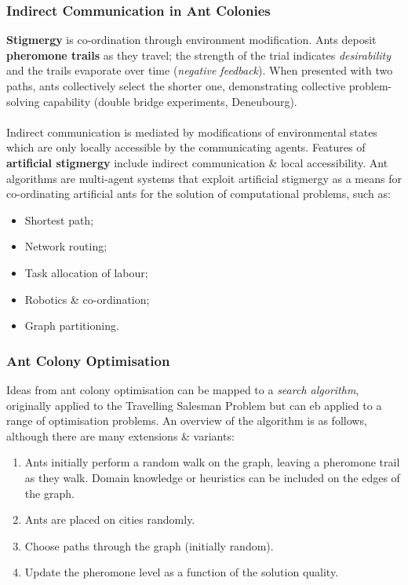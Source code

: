 \documentclass[a4paper,11pt]{article}
\begin{document}
\subsubsection{Indirect Communication in Ant Colonies}
\textbf{Stigmergy} is co-ordination through environment modification.
Ants deposit \textbf{pheromone trails} as they travel;
the strength of the trial indicates \textit{desirability} and the trails evaporate over time (\textit{negative feedback}).
When presented with two paths, ants collectively select the shorter one, demonstrating collective problem-solving capability (double bridge experiments, Deneubourg).
\\\\
Indirect communication is mediated by modifications of environmental states which are only locally accessible by the communicating agents.
Features of \textbf{artificial stigmergy} include indirect communication \& local accessibility.
Ant algorithms are multi-agent systems that exploit artificial stigmergy as a means for co-ordinating artificial ants for the solution of computational problems, such as:
\begin{itemize}
    \item   Shortest path;
    \item   Network routing;
    \item   Task allocation of labour;
    \item   Robotics \& co-ordination;
    \item   Graph partitioning.
\end{itemize}

\subsubsection{Ant Colony Optimisation}
Ideas from ant colony optimisation can be mapped to a \textit{search algorithm}, originally applied to the Travelling Salesman Problem but can eb applied to a range of optimisation problems.
An overview of the algorithm is as follows, although there are many extensions \& variants:
\begin{enumerate}
    \item   Ants initially perform a random walk on the graph, leaving a pheromone trail as they walk.
            Domain knowledge or heuristics can be included on the edges of the graph.
    \item   Ants are placed on cities randomly.
    \item   Choose paths through the graph (initially random).
    \item   Update the pheromone level as a function of the solution quality.
\end{enumerate}
\end{document}
